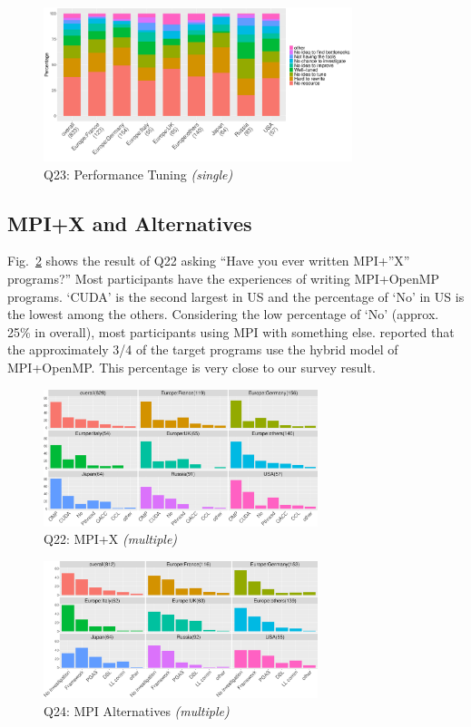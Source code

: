 \documentclass[conference,10pt,letterpaper]{IEEEtran}
\def\myquote#1{`#1'}
\begin{document}
\begin{figure}[htb]
\begin{center}
\includegraphics[width=9cm]{R-scripts/Q23.pdf}
\caption{Q23: Performance Tuning {\it(single)}}
\label{fig:tuning}
\end{center}
\end{figure}

\subsection{MPI+X and Alternatives}

Fig.~\ref{fig:mpi-x} shows the result of Q22 asking ``Have you ever
written MPI+''X'' programs?'' Most participants have the experiences of
writing MPI+OpenMP programs. \myquote{CUDA} is the second largest in
US and the percentage of \myquote{No} in US is the lowest among the
others. Considering the low percentage of \myquote{No} (approx.
25\% in overall), most participants using MPI with something else.
\cite{10.1145/3295500.3356176} reported that the approximately 3/4 of
the target programs use the hybrid model of MPI+OpenMP. This percentage
is very close to our survey result.

\begin{figure}[htb]
\begin{center}
\includegraphics[width=8cm]{R-scripts/Q22.pdf}
\caption{Q22: MPI+X {\it(multiple)}}
\label{fig:mpi-x}
\end{center}
\end{figure}

\begin{figure}[htb]
\begin{center}
\includegraphics[width=8cm]{R-scripts/Q24.pdf}
\caption{Q24: MPI Alternatives {\it(multiple)}}
\label{fig:mpi-alternatives}
\end{center}
\end{figure}
\end{document}
